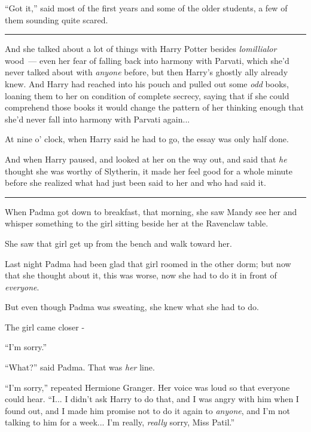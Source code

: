 ``Got it,'' said most of the first years and some of the older students, a few of them sounding quite scared.

\begin{center}\rule{3in}{0.4pt}\end{center}

And she talked about a lot of things with Harry Potter besides \emph{lomillialor} wood~--- even her fear of falling back into harmony with Parvati, which she'd never talked about with \emph{anyone} before, but then Harry's ghostly ally already knew. And Harry had reached into his pouch and pulled out some \emph{odd} books, loaning them to her on condition of complete secrecy, saying that if she could comprehend those books it would change the pattern of her thinking enough that she'd never fall into harmony with Parvati again...

At nine o' clock, when Harry said he had to go, the essay was only half done.

And when Harry paused, and looked at her on the way out, and said that \emph{he} thought she was worthy of Slytherin, it made her feel good for a whole minute before she realized what had just been said to her and who had said it.

\begin{center}\rule{3in}{0.4pt}\end{center}

When Padma got down to breakfast, that morning, she saw Mandy see her and whisper something to the girl sitting beside her at the Ravenclaw table.

She saw that girl get up from the bench and walk toward her.

Last night Padma had been glad that girl roomed in the other dorm; but now that she thought about it, this was worse, now she had to do it in front of \emph{everyone}.

But even though Padma was sweating, she knew what she had to do.

The girl came closer -

``I'm sorry.''

``What?'' said Padma. That was \emph{her} line.

``I'm sorry,'' repeated Hermione Granger. Her voice was loud so that everyone could hear. ``I... I didn't ask Harry to do that, and I was angry with him when I found out, and I made him promise not to do it again to \emph{anyone}, and I'm not talking to him for a week... I'm really, \emph{really} sorry, Miss Patil.''

